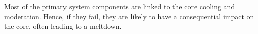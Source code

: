 Most of the primary system components are linked to the core cooling and moderation. Hence, if they fail, they are likely to have a consequential impact on the core, often leading to a meltdown.




